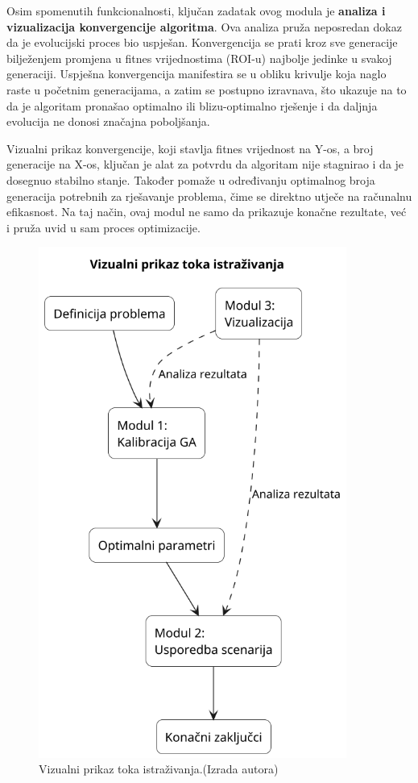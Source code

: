     Osim spomenutih funkcionalnosti, ključan zadatak ovog modula je \textbf{analiza i vizualizacija konvergencije algoritma}. Ova analiza pruža neposredan dokaz da je evolucijski proces bio uspješan. Konvergencija se prati kroz sve generacije bilježenjem promjena u fitnes vrijednostima (ROI-u) najbolje jedinke u svakoj generaciji. Uspješna konvergencija manifestira se u obliku krivulje koja naglo raste u početnim generacijama, a zatim se postupno izravnava, što ukazuje na to da je algoritam pronašao optimalno ili blizu-optimalno rješenje i da daljnja evolucija ne donosi značajna poboljšanja.

Vizualni prikaz konvergencije, koji stavlja fitnes vrijednost na Y-os, a broj generacije na X-os, ključan je alat za potvrdu da algoritam nije stagnirao i da je dosegnuo stabilno stanje. Također pomaže u određivanju optimalnog broja generacija potrebnih za rješavanje problema, čime se direktno utječe na računalnu efikasnost. Na taj način, ovaj modul ne samo da prikazuje konačne rezultate, već i pruža uvid u sam proces optimizacije.   

\begin{figure}[H]
    \centering
    \includegraphics[width=0.9\textwidth]{slike/tijek_istrazivanja.png}
    \caption{Vizualni prikaz toka istraživanja.(Izrada autora)}
    \label{fig:tok_istrazivanja}
\end{figure}
